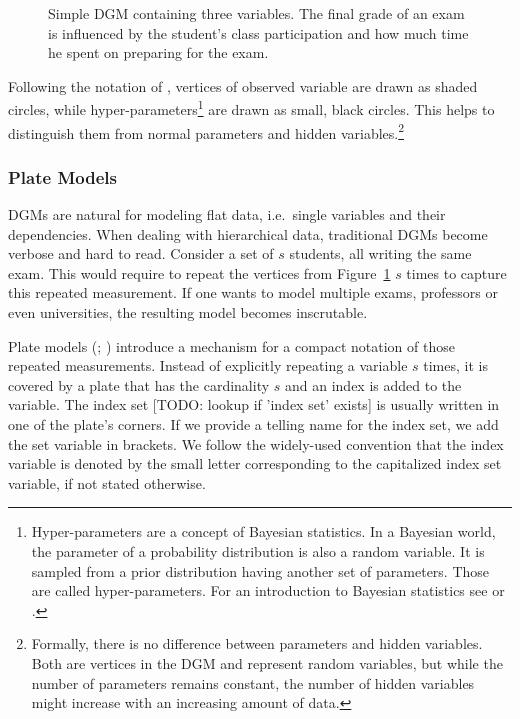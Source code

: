 \begin{figure}[t]
	\begin{center}
    	\scalebox{\tikzScale}{\adjustTikzSize }
	\end{center}
\caption[Simple directed graphical model containing three variables.]{Simple DGM containing three variables. The final grade of an exam is influenced by the student's class participation and how much time he spent on preparing for the exam.}
		\label{fig:simple_dgm}
\end{figure}

Following the notation of \textcite{bishop2006pattern}, vertices of observed variable are drawn as shaded circles, while hyper-parameters\footnote{Hyper-parameters are a concept of Bayesian statistics. In a Bayesian world, the parameter of a probability distribution is also a random variable. It is sampled from a prior distribution having another set of parameters. Those are called hyper-parameters. For an introduction to Bayesian statistics see \textcite{gelman2013bayesian} or \textcite{kruschke2010doing}.} are drawn as small, black circles. This helps to distinguish them from normal parameters and hidden variables.\footnote{Formally, there is no difference between parameters and hidden variables. Both are vertices in the DGM and represent random variables, but while the number of parameters remains constant, the number of hidden variables might increase with an increasing amount of data.}

\subsubsection{Plate Models}

DGMs are natural for modeling flat data, i.e.~single variables and their dependencies. When dealing with hierarchical data, traditional DGMs become verbose and hard to read. Consider a set of $s$ students, all writing the same exam. This would require to repeat the vertices from Figure~\ref{fig:simple_dgm} $s$ times to capture this repeated measurement. If one wants to model multiple exams, professors or even universities, the resulting model becomes inscrutable.

Plate models (\cite{buntine1994operations}; \cite{gilks1994language}) introduce a mechanism for a compact notation of those repeated measurements. Instead of explicitly repeating a variable $s$ times, it is covered by a plate that has the cardinality $s$ and an index is added to the variable. The index set [TODO: lookup if 'index set' exists] is usually written in one of the plate's corners. If we provide a telling name for the index set, we add the set variable in brackets. We follow the widely-used convention that the index variable is denoted by the small letter corresponding to the capitalized index set variable, if not stated otherwise.

